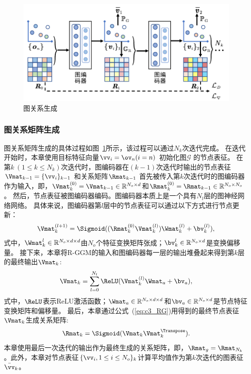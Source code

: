 \begin{figure}[!t]
\centering
\includegraphics[width=0.85\linewidth]{figure/c3_Rel_GGM.pdf}
\caption{图关系生成}
\label{fig:c3_Rel_GGM}
\end{figure}



\subsubsection{图关系矩阵生成}
图关系矩阵生成的具体过程如图~\ref{fig:c3_Rel_GGM}所示，该过程可以通过$N_k$次迭代完成。
在迭代开始时，本章使用目标特征向量$\vv_{i}=\ov_{n} (i=n)$ 初始化图$\mathcal{G}$ 的节点表征。
在第$k~(1\le k \le N_k)$次迭代时，图编码器在$(k-1)$次迭代时输出的节点表征$\Vmat_{k-1} = \{\vv_i \}_{k-1}$ 和关系矩阵$\Rmat_{k-1}$ 首先被传入第$k$次迭代时的图编码器作为输入，即，$\Vmat_k^{(0)}=\Vmat_{k-1} \in \mathbb{R}^{N_o \times d}$和$\Rmat_{k}^{(0)} = \Rmat_{k-1} \in \mathbb{R}^{N_o \times N_o}$。
然后，节点表征被图编码器编码。图编码器本质上是一个具有$N_l$层的图神经网络网络。
具体来说，图编码器第$l$层中的节点表征可以通过以下方式进行节点更新：
\begin{equation}
\Vmat^{(l+1)}_k = \Sigmoid((\Rmat_{k}^{(0)}\Vmat^{(l)}_k)\Wmat^{(l)}_k + \bv^{(l)}_k), 
\end{equation}
式中，$\Wmat^l_k \in \mathbb{R}^{N_o \times d \times d}$由$N_o$个特征变换矩阵张成；$\bv_k^l \in \mathbb{R}^{N_o \times d}$是变换偏移量。
接下来，本章将R-GGM的输入和图编码器每一层的输出堆叠起来得到第$k$层的最终输出$\Vmat_{k}$:
\begin{equation}
\Vmat_{k} = \sum_{l=0}^{N_l} \ReLU(\Vmat_k^{(l)}\Wmat_a + \bv_a), 
\label{eq:Encoder_sum}
\end{equation} 
式中，$\ReLU$表示ReLU激活函数；$\Wmat_a \in \mathbb{R}^{N_o \times d \times d}$和$\bv_a \in \mathbb{R}^{N_o \times d}$是节点特征变换矩阵和偏移量。
最后，本章通过公式~(\ref{eq:c3_RG})用得到的最终节点表征$\Vmat_{k}$生成关系矩阵:
\begin{equation}
\Rmat_k = \Sigmoid(\Vmat_k\Vmat_k^{\Transpose}).
\label{eq:c3_RG}
\end{equation}
本章使用最后一次迭代的输出作为最终生成的关系矩阵，即，$\Rmat_g = \Rmat_{N_k}$。此外，本章对节点表征$\{\vv_i, 1\le i \le N_o\}_{k}$计算平均值作为第$k$次迭代的图表征$\bar{\vv}_{k}$。


